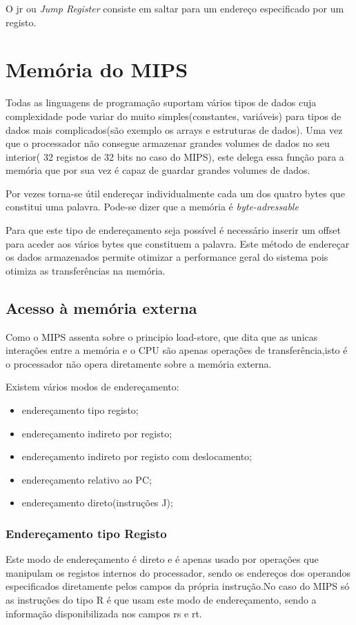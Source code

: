 \documentclass[10pt,a4paper]{book}
\begin{document}
 		O jr ou  \textit{Jump Register}  consiste em saltar para um endereço especificado por um registo.




 \chapter{Memória do MIPS}

    Todas as linguagens de programação suportam vários tipos de dados cuja complexidade pode variar do muito simples(constantes, variáveis) para tipos de dados mais complicados(são exemplo os arrays e estruturas de dados).
    Uma vez que o processador não consegue armazenar grandes volumes de dados no seu interior( 32 registos de 32 bits no caso do MIPS), este delega essa função para a memória que por sua vez é capaz de guardar grandes volumes de dados.

    Por vezes torna-se útil endereçar individualmente cada um dos quatro bytes que constitui uma palavra. Pode-se dizer que a memória é \textit{byte-adressable}

    Para que este tipo de endereçamento seja possível é necessário inserir um offset para aceder aos vários bytes que constituem a palavra.
    Este método de endereçar os dados armazenados permite otimizar a performance geral do sistema pois otimiza as transferências na memória.


		\section{Acesso à memória externa}

			Como o MIPS assenta sobre o principio load-store, que dita que as unicas interações entre a memória e o CPU são apenas  operações de transferência,isto é o processador não opera diretamente sobre a memória externa.

		Existem vários modos de endereçamento:
		\begin{itemize}
		  \item endereçamento tipo registo;
			\item endereçamento indireto por registo;
			\item endereçamento indireto por registo com deslocamento;
			\item endereçamento relativo ao PC;
			\item endereçamento direto(instruções J);
		\end{itemize}

		\subsection{Endereçamento tipo Registo}
			Este modo de endereçamento é direto e é apenas usado por operações que manipulam os registos internos do processador, sendo os endereços dos operandos especificados diretamente pelos campos da própria instrução.No caso do MIPS só as instruções do tipo R é que usam este modo de endereçamento, sendo a informação disponibilizada nos campos rs e rt.
\end{document}
